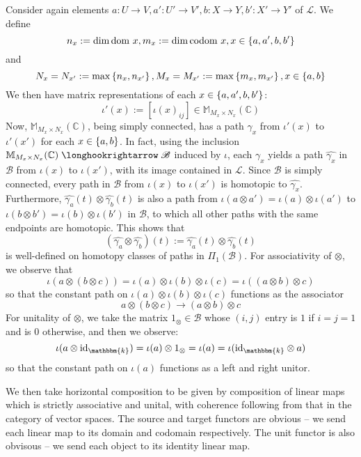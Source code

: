 \documentclass{amsart}
\newcommand{\M}{\mathbb{M}}
\newcommand{\C}{\mathbb{C}}
\newcommand{\K}{\mathbbm{k}}
\newcommand{\s}{\mathscr}
\newcommand{\wh}{\widehat}
\newcommand{\tensor}{\otimes}
\renewcommand{\to}[1][]{\stackrel{#1}{\longrightarrow}}
\newcommand{\hto}[1][]{\stackrel{#1}{\longhookrightarrow}}
\newcommand{\codom}{\text{codom }}
\newcommand{\dom}{\text{dom }}
\newcommand{\id}{\text{id}}
\newcommand{\curly}[1]{\left\{ #1 \right\}}
\newcommand{\set}[2][]{\ifthenelse{\equal{#1}{}}
                                  {\curly{#2}}
                                  {\curly{#1\ \textbf{:}\ #2}}}
\numberwithin{thm}{section}
\theoremstyle{definition}
\begin{document}
Consider again elements
$a : U \to V, a' : U' \to V', b : X \to Y, b' : X' \to Y'$ of $\s{L}$. We define
\[
  n_x := \dim \dom x, m_x := \dim \codom x, x \in \set{a, a', b, b'}
\]
and
\[
  N_{x} = N_{x'} := \max\set{n_x, n_{x'}},
  M_{x} = M_{x'} := \max\set{m_x, m_{x'}}, x \in \set{a, b}
\]
We then have matrix representations of each $x \in \set{a, a', b, b'}$:
\[
  \iota'(x) := [\iota(x)_{ij}] \in \M_{M_x \times N_x}(\C)
\]
Now, $\M_{M_x \times N_x}(\C)$, being simply connected, has a path
$\gamma_x$ from $\iota'(x)$ to $\iota'(x')$ for each $x \in \set{a, b}$. In
fact, using the inclusion $\M_{M_x \times N_x}(\C) \hto \s{B}$ induced by
$\iota$, each $\gamma_x$ yields a path $\wh{\gamma_x}$ in $\s{B}$ from
$\iota(x)$ to $\iota(x')$, with its image contained in $\s{L}$. Since $\s{B}$ is
simply connected, every path in $\s{B}$ from $\iota(x)$ to $\iota(x')$ is
homotopic to $\wh{\gamma_x}$. Furthermore,
$\wh{\gamma_a}(t) \tensor \wh{\gamma_b}(t)$ is also a path from
$\iota(a \tensor a') = \iota(a) \tensor \iota(a')$ to
$\iota(b \tensor b') = \iota(b) \tensor \iota(b')$ in $\s{B}$, to which all
other paths with the same endpoints are homotopic. This shows that
\[
  (\wh{\gamma_a} \tensor \wh{\gamma_b})(t) :=
    \wh{\gamma_a}(t) \tensor \wh{\gamma_b}(t)
\]
is well-defined on homotopy classes of paths in $\Pi_1(\s{B})$. For
associativity of $\tensor$, we observe that
\[
  \iota(a \tensor (b \tensor c))
    = \iota(a) \tensor \iota(b) \tensor \iota(c)
    = \iota((a \tensor b) \tensor c)
\]
so that the constant path on $\iota(a) \tensor \iota(b) \tensor \iota(c)$
functions as the associator
\[
  a \tensor (b \tensor c) \to (a \tensor b) \tensor c
\]
For unitality of $\tensor$, we take the matrix $1_{\tensor} \in \s{B}$ whose
$(i, j)$ entry is $1$ if $i = j = 1$ and is $0$ otherwise, and then we observe:
\[
  \iota(a \tensor \id_{\K}) = \iota(a) \tensor 1_{\tensor} = \iota(a)
    = \iota(\id_{\K} \tensor a)
\]
so that the constant path on $\iota(a)$ functions as a left and right unitor.

We then take horizontal composition to be given by composition of linear maps
which is strictly associative and unital, with coherence following from that in
the category of vector spaces. The source and target functors are obvious -- we
send each linear map to its domain and codomain respectively. The unit functor
is also obvisous -- we send each object to its identity linear map.
\end{document}
